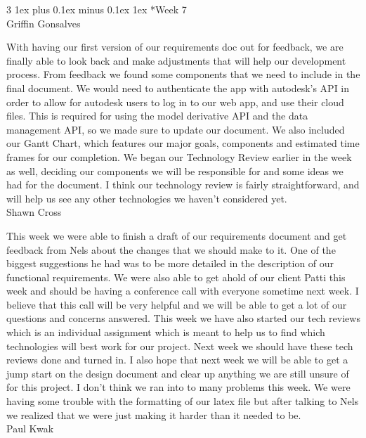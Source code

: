 \documentclass[letterpaper, 10pt, draftclsnofoot, compsoc, onecolumn]{IEEEtran}
\makeatletter
\def\subsubsection{\@startsection{subsubsection}%
                                 {3}%
                                 {\z@}%
                                 {1ex plus 0.1ex minus 0.1ex}%
                                 {1ex}%
                                 {\normalfont\normalsize}}%
\makeatother
\begin{document}
\subsubsection*{Week 7}\hspace*{\fill} \\ 
Griffin Gonsalves

With having our first version of our requirements doc out for feedback, we are finally able to look back and make adjustments that will help our development process. From feedback we found some components that we need to include in the final document. We would need to authenticate the app with autodesk's API in order to allow for autodesk users to log in to our web app, and use their cloud files. This is required for using the model derivative API and the data management API, so we made sure to update our document. We also included our Gantt Chart, which features our major goals, components and estimated time frames for our completion. We began our Technology Review earlier in the week as well, deciding our components we will be responsible for and some ideas we had for the document. I think our technology review is fairly straightforward, and will help us see any other technologies we haven't considered yet.\\

Shawn Cross

This week we were able to finish a draft of our requirements document and get feedback from Nels about the changes that we should make to it. One of the biggest suggestions he had was to be more detailed in the description of our functional requirements. We were also able to get ahold of our client Patti this week and should be having a conference call with everyone sometime next week. I believe that this call will be very helpful and we will be able to get a lot of our questions and concerns answered. This week we have also started our tech reviews which is an individual assignment which is meant to help us to find which technologies will best work for our project. Next week we should have these tech reviews done and turned in. I also hope that next week we will be able to get a jump start on the design document and clear up anything we are still unsure of for this project. I don't think we ran into to many problems this week. We were having some trouble with the formatting of our latex file but after talking to Nels we realized that we were just making it harder than it needed to be.\\

Paul Kwak
\end{document}
